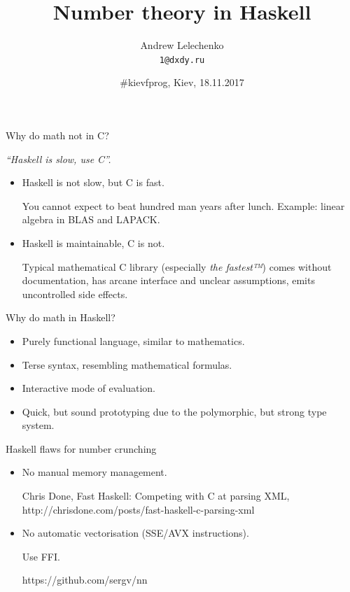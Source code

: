 \documentclass[handout]{beamer}
\title{Number theory in Haskell}
\author[Andrew Lelechenko]{Andrew Lelechenko \\ \texttt{1@dxdy.ru}}
\date{\#kievfprog, Kiev, 18.11.2017}
\begin{document}
\begin{frame}
	\titlepage
\end{frame}

\begin{frame}{Why do math not in C?}

\centerline{\em\large ``Haskell is slow, use C''.}

\begin{itemize}

\item Haskell is not slow, but C is fast.

  You cannot expect to beat hundred man years after lunch.
  Example: linear algebra in BLAS and LAPACK.

\item Haskell is maintainable, C is not.

  Typical mathematical C library (especially {\em the fastest™}) comes without documentation, has arcane interface and unclear assumptions, emits uncontrolled side effects.

\end{itemize}

\end{frame}

\begin{frame}{Why do math in Haskell?}

\begin{itemize}

\item Purely functional language, similar to mathematics.

\item Terse syntax, resembling mathematical formulas.

\item Interactive mode of evaluation.

\item Quick, but sound prototyping due to the polymorphic, but strong type system.

\end{itemize}

\end{frame}

\begin{frame}{Haskell flaws for number crunching}

\begin{itemize}

\item No manual memory management.

  Chris Done, Fast Haskell: Competing with C at parsing XML,
  http://chrisdone.com/posts/fast-haskell-c-parsing-xml

\item No automatic vectorisation (SSE/AVX instructions).

  Use FFI.

  https://github.com/sergv/nn

\end{itemize}

\end{frame}
\end{document}
